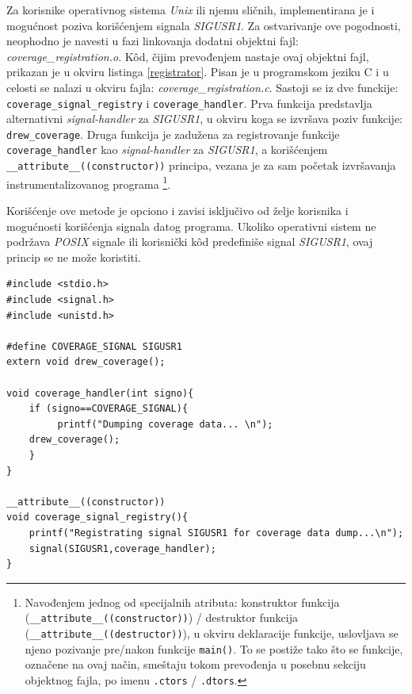 \documentclass[12pt,oneside]{memoir}
\newcommand{\kod}[1]{\texttt{#1}}
\newcommand{\strano}[1]{\textit{#1}}
\begin{document}
Za korisnike operativnog sistema \strano{Unix} ili njemu sličnih, implementirana je i mogućnost poziva korišćenjem signala \strano{SIGUSR1}. Za ostvarivanje ove pogodnosti, neophodno je navesti u fazi linkovanja dodatni objektni fajl: \strano{coverage\_registration.o}. K\^{o}d, čijim prevođenjem nastaje ovaj objektni fajl, prikazan je u okviru listinga \ref{registrator}. Pisan je u programskom jeziku C i u celosti se nalazi u okviru fajla:  \strano{coverage\_registration.c}. Sastoji se iz dve funckije: \kod{coverage\_signal\_registry} i \kod{coverage\_handler}. Prva funkcija predstavlja alternativni \strano{signal-handler} za \strano{SIGUSR1}, u okviru koga se izvršava poziv funkcije: \kod{drew\_coverage}. Druga funkcija je zadužena za registrovanje funkcije \kod{coverage\_handler} kao \strano{signal-handler} za \strano{SIGUSR1}, a korišćenjem \kod{\_\_attribute\_\_((constructor))} principa, vezana je za sam početak izvršavanja instrumentalizovanog programa \footnote{Navođenjem jednog od specijalnih atributa: konstruktor funkcija (\kod{\_\_attribute\_\_((constructor))}) / destruktor funkcija (\kod{\_\_attribute\_\_((destructor))}), u okviru deklaracije funkcije, uslovljava se njeno pozivanje pre/nakon funkcije \kod{main()}. To se postiže tako što se funkcije, označene na ovaj način, smeštaju tokom prevođenja u posebnu sekciju objektnog fajla, po imenu \kod{.ctors} / \kod{.dtors}.}. 

Korišćenje ove metode je opciono i zavisi isključivo od želje korisnika i mogućnosti korišćenja signala datog programa. Ukoliko operativni sistem ne podržava \strano{POSIX} signale ili korisnički k\^{o}d predefiniše signal \strano{SIGUSR1}, ovaj princip se ne može koristiti.

\newpage

\begin{lstlisting}[caption={Izvorni k\^{o}d u okviru fajla: \strano{coverage\_registration.c}},frame=single, label=registrator]
#include <stdio.h>                                                       
#include <signal.h>                                                      
#include <unistd.h>     

#define COVERAGE_SIGNAL SIGUSR1
extern void drew_coverage();

void coverage_handler(int signo){
    if (signo==COVERAGE_SIGNAL){
         printf("Dumping coverage data... \n");
    drew_coverage();
    }
}

__attribute__((constructor))
void coverage_signal_registry(){
    printf("Registrating signal SIGUSR1 for coverage data dump...\n");
    signal(SIGUSR1,coverage_handler);
}
\end{lstlisting}
\end{document}
